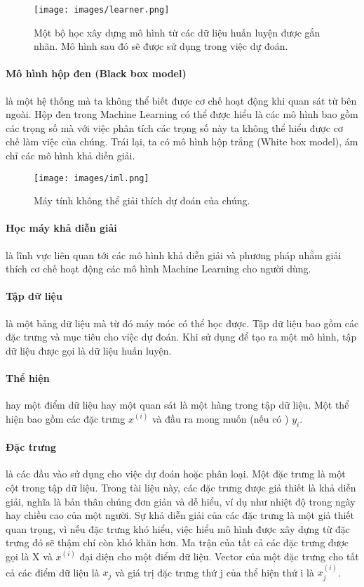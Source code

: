\begin{figure*}[hbt!]
	\centering
	\texttt{[image: images/learner.png]}
	\label{fig:learner}
	\caption{Một bộ học xây dựng mô hình từ các dữ liệu huấn luyện được gắn nhãn. Mô hình sau đó sẽ được sử dụng trong việc dự đoán.}
\end{figure*}

\paragraph{Mô hình hộp đen (Black box model)} là một hệ thống mà ta không thể biết được cơ chế hoạt động khi quan sát từ bên ngoài. Hộp đen trong Machine Learning có thể được hiểu là các mô hình bao gồm các trọng số mà với việc phân tích các trọng số này ta không thể hiểu được cơ chế làm việc của chúng. Trái lại, ta có mô hình hộp trắng (White box model), ám chỉ các mô hình khả diễn giải.  

\begin{figure*}[h!]
	\centering
	\texttt{[image: images/iml.png]}
	\caption{Máy tính không thể giải thích dự đoán của chúng.}
\end{figure*}

\paragraph{Học máy khả diễn giải} là lĩnh vực liên quan tới các mô hình khả diễn giải và phương pháp nhằm giải thích cơ chế hoạt động các mô hình Machine Learning cho người dùng.

\paragraph{Tập dữ liệu} là một bảng dữ liệu mà từ đó máy móc có thể học được. Tập dữ liệu bao gồm các đặc trưng và mục tiêu cho việc dự đoán. Khi sử dụng để tạo ra một mô hình, tập dữ liệu được gọi là dữ liệu huấn luyện.

\paragraph{Thể hiện} hay một điểm dữ liệu hay một quan sát là một hàng trong tập dữ liệu. Một thể hiện bao gồm các đặc trưng $x^{(i)}$ và đầu ra mong muốn (nếu có
) $y_i$.

\paragraph{Đặc trưng} là các đầu vào sử dụng cho việc dự đoán hoặc phân loại. Một đặc trưng là một cột trong tập dữ liệu. Trong tài liệu này, các đặc trưng được giả thiết là khả diễn giải, nghĩa là bản thân chúng đơn giản và dễ hiểu, ví dụ như nhiệt độ trong ngày hay chiều cao của một người. Sự khả diễn giải của các đặc trưng là một giả thiết quan trọng, vì nếu đặc trưng khó hiểu, việc hiểu mô hình được xây dựng từ đặc trưng đó sẽ thậm chí còn khó khăn hơn. Ma trận của tất cả các đặc trưng được gọi là X và $x^{(i)}$ đại diện cho một điểm dữ liệu. Vector của một đặc trưng cho tất cả các điểm dữ liệu là $x_j$ và giá trị đặc trưng thứ j của thể hiện thứ i là $x^{(i)}_j$.

